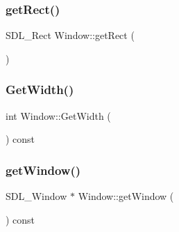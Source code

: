 \hypertarget{class_ori_engine_1_1_window_a53ff5d3c56b28604d41b676bfdbf5129}{}\label{class_ori_engine_1_1_window_a53ff5d3c56b28604d41b676bfdbf5129} 
\subsubsection{\texorpdfstring{get\+Rect()}{getRect()}}
{\footnotesize\ttfamily S\+D\+L\+\_\+\+Rect Window\+::get\+Rect (\begin{DoxyParamCaption}{ }\end{DoxyParamCaption})}

\hypertarget{class_ori_engine_1_1_window_a451bdfeab37afce97712f23f5c2492aa}{}\label{class_ori_engine_1_1_window_a451bdfeab37afce97712f23f5c2492aa} 
\subsubsection{\texorpdfstring{Get\+Width()}{GetWidth()}}
{\footnotesize\ttfamily int Window\+::\+Get\+Width (\begin{DoxyParamCaption}{ }\end{DoxyParamCaption}) const}

\hypertarget{class_ori_engine_1_1_window_acf146679abf09abf89941b1882fc92dc}{}\label{class_ori_engine_1_1_window_acf146679abf09abf89941b1882fc92dc} 
\subsubsection{\texorpdfstring{get\+Window()}{getWindow()}}
{\footnotesize\ttfamily S\+D\+L\+\_\+\+Window $\ast$ Window\+::get\+Window (\begin{DoxyParamCaption}{ }\end{DoxyParamCaption}) const}

\hypertarget{class_ori_engine_1_1_window_a41cab6dae60380563b8bc593e87f0c87}{}\label{class_ori_engine_1_1_window_a41cab6dae60380563b8bc593e87f0c87} 
